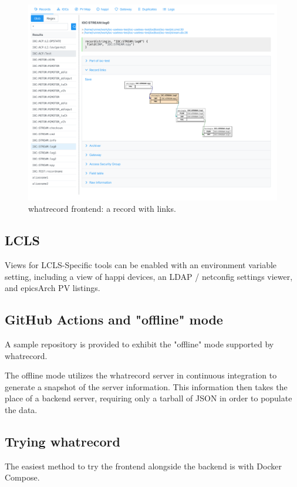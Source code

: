 \documentclass[letter,
               keeplastbox,   %
               ]{jacow}
\begin{document}
\begin{figure}
   \centering
   \includegraphics*[width=.9\columnwidth]{whatrecord-ioc-stream-log0}
   \caption{whatrecord frontend: a record with links.}
   \label{fig:whatrecord-links}
\end{figure}

\subsection{LCLS}
Views for LCLS-Specific tools can be enabled with an environment variable
setting, including a view of happi devices, an LDAP / netconfig settings
viewer, and epicsArch PV listings.

\subsection{GitHub Actions and "offline" mode}

A sample repository\cite{gha-sample} is provided to exhibit the "offline" mode
supported by whatrecord.

The offline mode utilizes the whatrecord server in continuous integration to
generate a snapshot of the server information. This information then takes
the place of a backend server, requiring only a tarball of JSON in order to
populate the data.

\subsection{Trying whatrecord}

The easiest method to try the frontend alongside the backend is with Docker
Compose.
\end{document}
